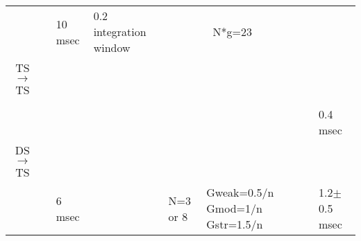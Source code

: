 \begin{longtable}{cXXXXXXX}
                                 &             \citep{ReissYoung:2005}              &                                                      10 msec                                                       &                  0.2 integration window                   &                                                       \multicolumn{2}{c}{N*g=23}                                                        &                                           & \\ 
  TS\ensuremath{\rightarrow}TS   &                                                  &                                                                                                                    &                                                           &                                           &                                                                                             &                                           & \\\midrule
                                 &           \citep{WiegrebeMeddis:2004}            &                                                                                                                    &                                                           &                                           &                                                                                             &                                           & \\ 
                                 &  \citep{BahmerLangner:2006,BahmerLangner:2006a}  &                                                                                                                    &                                                           &                                           &                                                                                             &                                           & 0.4 msec\\
  DS\ensuremath{\rightarrow}TS   &                                                  &                                                                                                                    &                                                           &                                           &                                                                                             &                                           & \\\midrule
                                 &           \citep{ErikssonRobert:1999}            &                                                       6 msec                                                       &                                                           &                 N=3 or 8                  &                               Gweak=0.5/n Gmod=1/n Gstr=1.5/n                               &                                           & 1.2$\pm$0.5 msec \\ 

\end{longtable}
